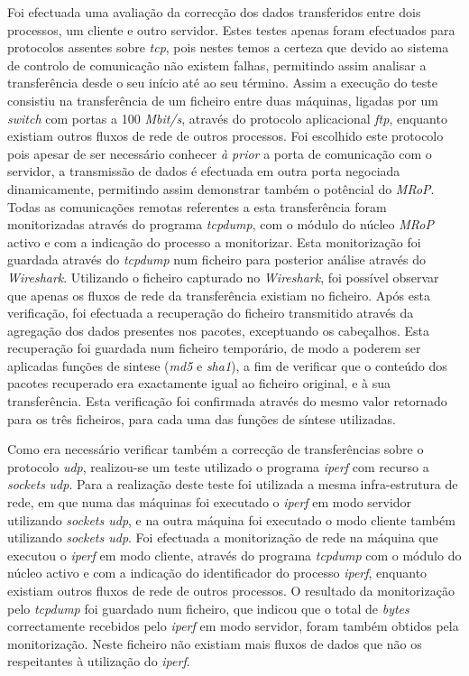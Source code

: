 Foi efectuada uma avaliação da correcção dos dados transferidos entre dois processos, um cliente e outro servidor.
Estes testes apenas foram efectuados para protocolos assentes sobre \textit{tcp}, pois nestes temos a certeza que devido ao sistema de controlo de comunicação não existem falhas, permitindo assim analisar a transferência desde o seu início até ao seu término.
Assim a execução do teste consistiu na transferência de um ficheiro entre duas máquinas, ligadas por um \textit{switch} com portas a 100 \textit{Mbit/s}, através do protocolo aplicacional \textit{ftp}, enquanto existiam outros fluxos de rede de outros processos.
Foi escolhido este protocolo pois apesar de ser necessário conhecer \textit{à prior} a porta de comunicação com o servidor, a transmissão de dados é efectuada em outra porta negociada dinamicamente, permitindo assim demonstrar também o potêncial do \textit{MRoP}.
Todas as comunicações remotas referentes a esta transferência foram monitorizadas através do programa \textit{tcpdump}, com o módulo do núcleo \textit{MRoP} activo e com a indicação do processo a monitorizar.
Esta monitorização foi guardada através do \textit{tcpdump} num ficheiro para posterior análise através do \textit{Wireshark}.
Utilizando o ficheiro capturado no \textit{Wireshark}, foi possível observar que apenas os fluxos de rede da transferência existiam no ficheiro.
Após esta verificação, foi efectuada a recuperação do ficheiro transmitido através da agregação dos dados presentes nos pacotes, exceptuando os cabeçalhos.
Esta recuperação foi guardada num ficheiro temporário, de modo a poderem ser aplicadas funções de sintese (\textit{md5} e \textit{sha1}), a fim de verificar que o conteúdo dos pacotes recuperado era exactamente igual ao ficheiro original, e à sua transferência.
Esta verificação foi confirmada através do mesmo valor retornado para os três ficheiros, para cada uma das funções de síntese utilizadas.

Como era necessário verificar também a correcção de transferências sobre o protocolo \textit{udp}, realizou-se um teste utilizado o programa \textit{iperf} com recurso a \textit{sockets} \textit{udp}.
Para a realização deste teste foi utilizada a mesma infra-estrutura de rede, em que numa das máquinas foi executado o \textit{iperf} em modo servidor utilizando \textit{sockets udp}, e na outra máquina foi executado o modo cliente também utilizando \textit{sockets udp}.
Foi efectuada a monitorização de rede na máquina que executou o \textit{iperf} em modo cliente, através do programa \textit{tcpdump} com o módulo do núcleo activo e com a indicação do identificador do processo \textit{iperf}, enquanto existiam outros fluxos de rede de outros processos.
O resultado da monitorização pelo \textit{tcpdump} foi guardado num ficheiro, que indicou que o total de \textit{bytes} correctamente recebidos pelo \textit{iperf} em modo servidor, foram também obtidos pela monitorização.
Neste ficheiro não existiam mais fluxos de dados que não os respeitantes à utilização do \textit{iperf}.

